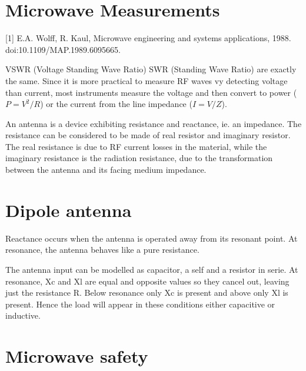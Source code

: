 \section{Microwave Measurements}
[1] E.A. Wolff, R. Kaul, Microwave engineering and systems applications, 1988. doi:10.1109/MAP.1989.6095665.

VSWR (Voltage Standing Wave Ratio)
SWR (Standing Wave Ratio) are exactly the same. Since it is more practical to measure RF waves vy detecting voltage than current, most instruments measure the voltage and then convert to power ($P=V^2/R$) or the current from the line impedance ($I=V/Z$).

An antenna is a device exhibiting resistance and reactance, ie. an impedance. The resistance can be considered to be made of real resistor and imaginary resistor. The real resistance is due to RF current losses in the material, while the imaginary resistance is the radiation resistance, due to the transformation between the antenna and its facing medium impedance. 

\section{Dipole antenna}
Reactance occurs when the antenna is operated away from its resonant point. At resonance, the antenna behaves like a pure resistance. 

The antenna input can be modelled as capacitor, a self and a resistor in serie. At resonance, Xc and Xl are equal and opposite values so they cancel out, leaving just the resistance R. Below resonance only Xc is present and above only Xl is present. Hence the load will appear in these conditions either capacitive or inductive. 

 
\section{Microwave safety}
\parencite[sec.5.8.3]{Benford2015}


